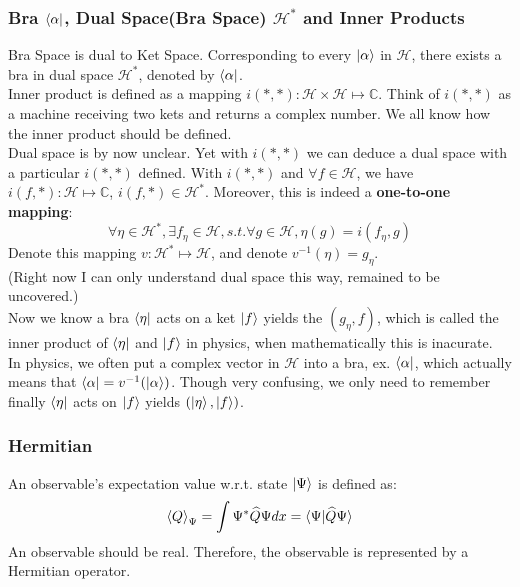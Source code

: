 \documentclass[a4paper, 11pt]{article}
\begin{document}
\subsubsection{Bra $\bra{\alpha}$, Dual Space(Bra Space) $\mathcal{H}^*$ and Inner Products}
Bra Space is dual to Ket Space. Corresponding to every $\ket{\alpha}$ in $\mathcal{H}$, there exists a bra in dual space $\mathcal{H}^*$, denoted by $\bra{\alpha}$.\\
\indent Inner product is defined as a mapping $i(*, *): \mathcal{H}\times\mathcal{H} \mapsto \mathbb{C}$. Think of $i(*, *)$ as a machine receiving two kets and returns a complex number. We all know how the inner product should be defined.\\
\indent Dual space is by now unclear. Yet with $i(*, *)$ we can deduce a dual space with a particular $i(*, *)$ defined. With $i(*, *)$ and $\forall f \in \mathcal{H}$, we have $i(f, *): \mathcal{H} \mapsto \mathbb{C}$, $i(f, *) \in \mathcal{H}^*$. Moreover, this is indeed a \textbf{one-to-one mapping}:
\begin{equation}
\forall \eta \in \mathcal{H}^*, \exists f_{\eta} \in \mathcal{H}, s.t. \forall g \in \mathcal{H}, \eta(g) = i(f_{\eta}, g)
\end{equation}
\indent Denote this mapping $v: \mathcal{H}^* \mapsto \mathcal{H}$, and denote $v^{-1}(\eta) = g_{\eta}$. \\
(Right now I can only understand dual space this way, remained to be uncovered.)\\
\indent Now we know a bra $\bra{\eta}$ acts on a ket $\ket{f}$ yields the $(g_{\eta}, f)$, which is called the inner product of $\bra{\eta}$ and $\ket{f}$ in physics, when mathematically this is inacurate.\\
\indent In physics, we often put a complex vector in $\mathcal{H}$ into a bra, ex. $\bra{\alpha}$, which actually means that $\bra{\alpha} = v^{-1}(\ket{\alpha})$. Though very confusing, we only need to remember finally $\bra{\eta}$ acts on $\ket{f}$ yields $(\ket{\eta}, \ket{f})$.

\subsubsection{Hermitian}
An observable's expectation value w.r.t. state $\ket{\Psi}$ is defined as:
\begin{equation}
	\braket{Q}_{\Psi} = \int\Psi^* \widehat{Q} \Psi dx = \braket{\Psi|\widehat{Q} \Psi}
\end{equation}
\indent An observable should be real. Therefore, the observable is represented by a Hermitian operator.
\end{document}
